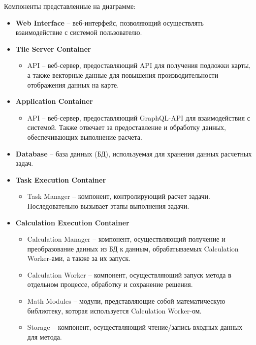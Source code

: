 \noindent Компоненты представленные на диаграмме:
\begin{itemize}
	\item \textbf{Web Interface} -- веб-интерфейс, позволяющий осуществлять взаимодействие с системой пользователю.
	\item \textbf{Tile Server Container}
	\begin{itemize}
		\item API -- веб-сервер, предоставляющий API для получения подложки карты, а также векторные данные для
		повышения производительности отображения данных на карте.
	\end{itemize}
	\item \textbf{Application Container}
	\begin{itemize}
		\item API -- веб-сервер, предоставляющий GraphQL-API для взаимодействия с системой.
		Также отвечает за предоставление и обработку данных, обеспечивающих выполнение расчета.
	\end{itemize}
	\item \textbf{Database} -- база данных (БД), используемая для хранения данных расчетных задач.
	\item {\bf Task Execution Container}
	\begin{itemize}
		\item Task Manager -- компонент, контролирующий расчет задачи. Последовательно вызывает этапы выполнения задачи.
	\end{itemize}
	\item {\bf Calculation Execution Container}
	\begin{itemize}
		\item Calculation Manager -- компонент, осуществляющий получение и преобразование данных из БД к данным,
		обрабатываемых Calculation Worker-ами, а также за их запуск.
		\item Calculation Worker -- компонент, осуществляющий запуск метода в отдельном процессе, обработку и сохранение решения.
		\item Math Modules -- модули, представляющие собой математическую библиотеку, которая используется Calculation Worker-ом.
		\item Storage -- компонент, осуществляющий чтение/запись входных данных для метода.
	\end{itemize}
\end{itemize}


